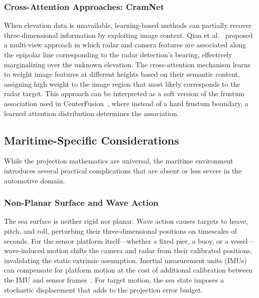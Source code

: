 \subsubsection{Cross-Attention Approaches: CramNet}

When elevation data is unavailable, learning-based methods can partially recover three-dimensional information by exploiting image context. Qian et al.~\cite{qian2021mvdnet} proposed a multi-view approach in which radar and camera features are associated along the epipolar line corresponding to the radar detection's bearing, effectively marginalizing over the unknown elevation. The cross-attention mechanism learns to weight image features at different heights based on their semantic content, assigning high weight to the image region that most likely corresponds to the radar target. This approach can be interpreted as a soft version of the frustum association used in CenterFusion~\cite{Nabati2021CenterFusion}, where instead of a hard frustum boundary, a learned attention distribution determines the association.

\subsection{Maritime-Specific Considerations}\label{subsec:maritime}

While the projection mathematics are universal, the maritime environment introduces several practical complications that are absent or less severe in the automotive domain.

\subsubsection{Non-Planar Surface and Wave Action}

The sea surface is neither rigid nor planar. Wave action causes targets to heave, pitch, and roll, perturbing their three-dimensional positions on timescales of seconds. For the sensor platform itself---whether a fixed pier, a buoy, or a vessel---wave-induced motion shifts the camera and radar from their calibrated positions, invalidating the static extrinsic assumption. Inertial measurement units (IMUs) can compensate for platform motion at the cost of additional calibration between the IMU and sensor frames~\cite{patino2021fusion}. For target motion, the sea state imposes a stochastic displacement that adds to the projection error budget.

